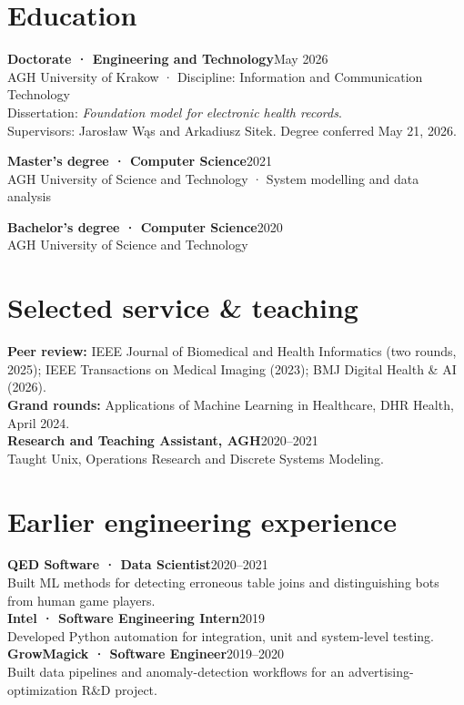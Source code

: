 \documentclass[10pt,letterpaper]{article}
\begin{document}
\section{Education}
\textbf{Doctorate · Engineering and Technology}\hfill May 2026\\
AGH University of Krakow · Discipline: Information and Communication Technology\\
{\small Dissertation: \textit{Foundation model for electronic health records}.\\
Supervisors: Jarosław Wąs and Arkadiusz Sitek. Degree conferred May 21, 2026.}\par
\textbf{Master's degree · Computer Science}\hfill 2021\\
AGH University of Science and Technology · System modelling and data analysis\par
\textbf{Bachelor's degree · Computer Science}\hfill 2020\\
AGH University of Science and Technology
\section{Selected service \& teaching}
\textbf{Peer review:} IEEE Journal of Biomedical and Health Informatics (two rounds, 2025);
IEEE Transactions on Medical Imaging (2023); BMJ Digital Health \& AI (2026).\\
\textbf{Grand rounds:} Applications of Machine Learning in Healthcare, DHR Health, April 2024.\\
\textbf{Research and Teaching Assistant, AGH}\hfill 2020–2021\\
Taught Unix, Operations Research and Discrete Systems Modeling.
\section{Earlier engineering experience}
\textbf{QED Software · Data Scientist}\hfill 2020–2021\\
Built ML methods for detecting erroneous table joins and distinguishing bots from human game players.\\
\textbf{Intel · Software Engineering Intern}\hfill 2019\\
Developed Python automation for integration, unit and system-level testing.\\
\textbf{GrowMagick · Software Engineer}\hfill 2019–2020\\
Built data pipelines and anomaly-detection workflows for an advertising-optimization R\&D project.
\end{document}
